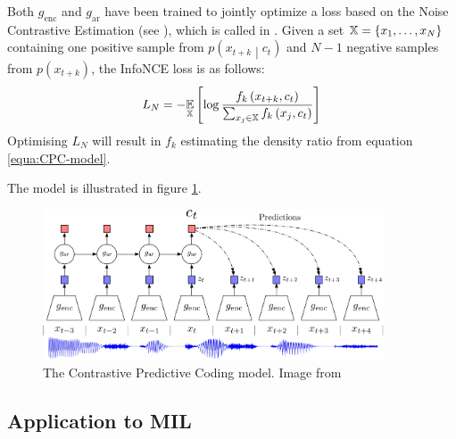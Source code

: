 Both \( g_\mathrm{enc} \) and \( g_\mathrm{ar} \) have been trained to jointly optimize a loss based on the Noise Contrastive Estimation (see \cite{gutmann_noise-contrastive_2010}), which is called  in \cite{oord_representation_2019}. Given a set \( \mathbb{X} = \left\{ x_1, \dots, x_N \right\} \) containing one positive sample from \( p \left( x_{t + k} \middle| c_t \right) \) and \( N - 1 \) negative samples from \( p \left( x_{t + k} \right) \), the InfoNCE loss is as follows:
\[ L_N = - \underset{\mathbb{X}}{\mathbb{E}} \left[ \log \frac{f_k \left( x_{t + k}, c_t \right)}{\sum_{x_j \in \mathbb{X}} f_k \left( x_j, c_t \right)} \right] \]
Optimising \( L_N \) will result in \( f_k \) estimating the density ratio from equation \ref{equa:CPC-model}.

The model is illustrated in figure \ref{fig:CPC-paper-model}.

\begin{figure}[h]
	\centering
	\includegraphics[width=0.9\textwidth]{images/CPC-paper-model.pdf}
	\caption{The Contrastive Predictive Coding model. Image from \cite{oord_representation_2019}}\label{fig:CPC-paper-model}
\end{figure}

\subsection{Application to MIL}
